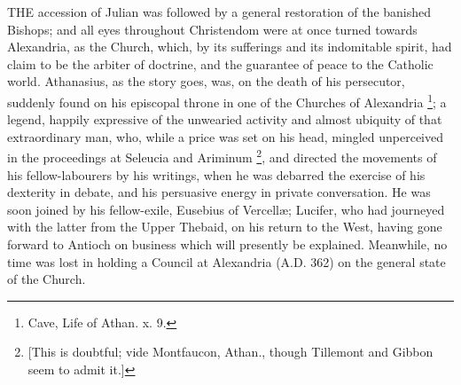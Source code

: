 

THE accession of Julian was followed by
a general restoration of the banished Bishops; and all eyes throughout
Christendom were at once turned towards Alexandria, as the Church,
which, by its sufferings and its indomitable spirit, had claim to be
the arbiter of doctrine, and the guarantee of peace to the Catholic
world. Athanasius, as the story goes, was, on the death of his
persecutor, suddenly found on his episcopal throne in one of the
Churches of Alexandria \footnote{Cave, Life of Athan. x. 9.}; a
legend, happily expressive of the unwearied activity and almost
ubiquity of that extraordinary man, who, while a price was set on his
head, mingled unperceived in the proceedings at Seleucia and Ariminum
\footnote{[This is doubtful; vide Montfaucon, Athan.,
though Tillemont and Gibbon seem to admit it.]}, and directed the
movements of his fellow-labourers by his writings, when he was
debarred the exercise of his dexterity in debate, and his persuasive
energy in private conversation. He was soon joined by his
fellow-exile, Eusebius of Vercellæ; Lucifer, who had journeyed with
the latter from the Upper Thebaid, on his return to the West, having
gone forward to Antioch on business which will presently be explained.
Meanwhile, no time was lost in holding a Council at Alexandria (A.D.
362) on the general state of the Church.

